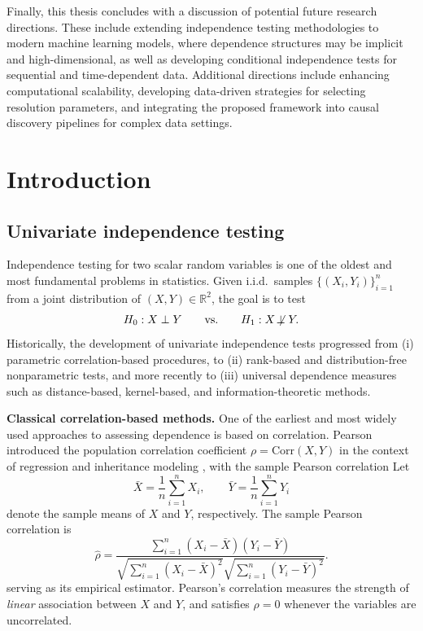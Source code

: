 \documentclass[12pt,reqno,oneside]{amsbook}
\theoremstyle{definition}
\theoremstyle{remark}
\begin{document}
Finally, this thesis concludes with a discussion of potential future research directions. These include extending independence testing methodologies to modern machine learning models, where dependence structures may be implicit and high-dimensional, as well as developing conditional independence tests for sequential and time-dependent data. Additional directions include enhancing computational scalability, developing data-driven strategies for selecting resolution parameters, and integrating the proposed framework into causal discovery pipelines for complex data settings.

\mainmatter

\doublespacing %

\chapter{Introduction}

\section{Univariate independence testing}
\label{subsec:univariate-independence}

Independence testing for two scalar random variables is one of the oldest and most fundamental
problems in statistics.
Given i.i.d.\ samples $\{(X_i,Y_i)\}_{i=1}^n$ from a joint distribution of $(X,Y)\in\mathbb{R}^2$,
the goal is to test
\[
H_0: X \perp Y
\qquad \text{vs.}\qquad
H_1: X \not\!\perp Y.
\]
Historically, the development of univariate independence tests progressed from
(i) parametric correlation-based procedures,
to (ii) rank-based and distribution-free nonparametric tests,
and more recently to (iii) universal dependence measures such as distance-based,
kernel-based, and information-theoretic methods.

\textbf{Classical correlation-based methods.}
One of the earliest and most widely used approaches to assessing dependence
is based on correlation.
Pearson introduced the population correlation coefficient $\rho=\mathrm{Corr}(X,Y)$
in the context of regression and inheritance modeling \citep{Pearson1896},
with the sample Pearson correlation
Let
\[
\bar X=\frac{1}{n}\sum_{i=1}^n X_i,
\qquad
\bar Y=\frac{1}{n}\sum_{i=1}^n Y_i
\]
denote the sample means of $X$ and $Y$, respectively. The sample Pearson correlation is
\[
\hat\rho
=
\frac{\sum_{i=1}^n (X_i-\bar X)(Y_i-\bar Y)}
     {\sqrt{\sum_{i=1}^n (X_i-\bar X)^2}
      \sqrt{\sum_{i=1}^n (Y_i-\bar Y)^2}}.
\]
serving as its empirical estimator.
Pearson’s correlation measures the strength of \emph{linear} association between $X$ and $Y$,
and satisfies $\rho=0$ whenever the variables are uncorrelated.
\end{document}
